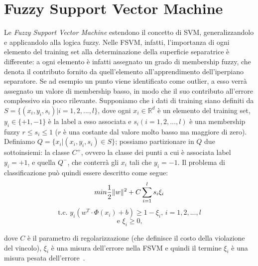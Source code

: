 \documentclass[oneside, openany]{book}
\DeclarePairedDelimiter{\norma}{\lVert}{\rVert}
\begin{document}
	\section{Fuzzy Support Vector Machine}
	Le \textit{Fuzzy Support Vector Machine} estendono il concetto di SVM, generalizzandolo e applicandolo alla logica fuzzy. Nelle FSVM, infatti, l'importanza di ogni elemento del training set alla determinazione della superficie separatrice è differente: a ogni elemento è infatti assegnato un grado di membership fuzzy, che denota il contributo fornito da quell'elemento all'apprendimento dell'iperpiano separatore. Se ad esempio un punto viene identificato come outlier, a esso verrà assegnato un valore di membership basso, in modo che il suo contributo all'errore complessivo sia poco rilevante. Supponiamo che i dati di training siano definiti da $S = \{(x_i, y_i, s_i)| i=1,2,...,l\}$, dove ogni $x_i \in \mathbb{R}^d$ è un elemento del training set, $y_i \in \{+1, -1\}$ è la label a esso associata e $s_i(i=1,2,...,l)$ è una membership fuzzy $r \leq s_i \leq 1$ ($r$ è una costante dal valore molto basso ma maggiore di zero). Definiamo $Q=\{x_i|(x_i, y_i, s_i)\in S\}$; possiamo partizionare in $Q$ due sottoinsiemi: la classe $C^+$, ovvero la classe dei punti a cui è associata label $y_i=+1$, e quella $Q^-$, che conterrà gli $x_i$ tali che $y_i=-1$. Il problema di classificazione può quindi essere descritto come segue:
		\[
		min \frac{1}{2} \norma{w}^2+C\sum_{i=1}^{l}s_i\xi_i
		\]
		\[	
		\text{t.c. } y_i(w^T\cdot \Phi(x_i)+b)\geq 1-\xi_i \text{, } i=1, 2, ..., l
		\]
		\[
		\text{e } \xi_i \geq 0\text{,}		
		\]
	
	dove $C$ è il parametro di regolarizzazione (che definisce il costo della violazione del vincolo), $\xi_i$ è una misura dell'errore nella FSVM e quindi il termine $\xi_i$ è una misura pesata dell'errore~\cite{bib:fsvm,bib:fsvm2}.\\
	
\end{document}
